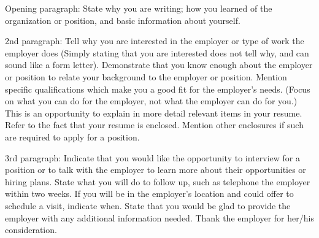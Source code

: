 \documentclass[11pt, a4paper]{awesome-cv}
\begin{document}
\makecvheader

\makelettertitle

\begin{cvletter}


Opening paragraph: State why you are writing; how you learned of the organization or position, and basic information about yourself.

2nd paragraph: Tell why you are interested in the employer or type of work the employer does (Simply stating that you are interested does not tell why, and can sound like a form letter). Demonstrate that you know enough about the employer or position to relate your background to the employer or position. Mention specific qualifications which make you a good fit for the employer’s needs. (Focus on what you can do for the employer, not what the employer can do for you.) This is an opportunity to explain in more detail relevant items in your resume. Refer to the fact that your resume is enclosed. Mention other enclosures if such are required to apply for a position.

3rd paragraph: Indicate that you would like the opportunity to interview for a position or to talk with the employer to learn more about their opportunities or hiring plans. State what you will do to follow up, such as telephone the employer within two weeks. If you will be in the employer’s location and could offer to schedule a visit, indicate when. State that you would be glad to provide the employer with any additional information needed. Thank the employer for her/his consideration.

\end{cvletter}

\makeletterclosing
\end{document}
